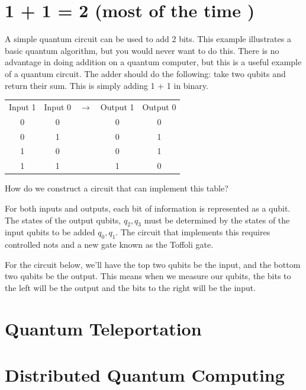 \section{  1 + 1 = 2 (most of the time )}

A simple quantum circuit can be used to add 2 bits. This example illustrates a basic quantum algorithm, but you would never want to do this. There is no advantage in doing addition on a quantum computer, but this is a useful example of a quantum circuit. The adder should do the following: take two qubits and return their sum. This is simply adding 1 + 1 in binary.

\begin{center}
\begin{tabular}{ | c | c | c | c | c |}

 Input 1 & Input 0 & $\rightarrow{}$ & Output 1 & Output 0 \\ 
  
 0 & 0 &  & 0 & 0 \\ 
 
 0 & 1 &  & 0 & 1 \\
 
 1 & 0 &  & 0 & 1 \\
 
 1 & 1 &  & 1 & 0 \\
 
  
\end{tabular}
\end{center}


How do we construct a circuit that can implement this table? 

For both inputs and outputs, each bit of information is represented as a qubit. The states of the output qubits, $q_2, q_3$ must be determined by the states of the input qubits to be added $q_0, q_1$. The circuit that implements this requires controlled nots and a new gate known as the Toffoli gate.

For the circuit below, we'll have the top two qubits be the input, and the bottom two qubits be the output. This means when we measure our qubits, the bits to the left will be the output and the bits to the right will be the input. 

\section{Quantum Teleportation}


\section{Distributed Quantum Computing}


